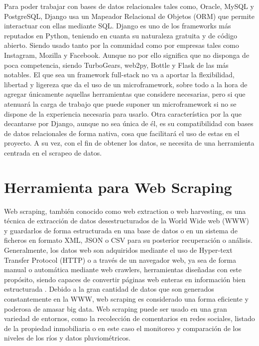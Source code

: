 Para poder trabajar con bases de datos relacionales tales como, Oracle, MySQL y PostgreSQL, Django usa un Mapeador Relacional de Objetos (ORM) que permite interactuar con ellas mediante SQL.\newline
\newline
Django es uno de los frameworks más reputados en Python, teniendo en cuanta su naturaleza gratuita y de código abierto. Siendo usado tanto por la comunidad como por empresas tales como Instagram, Mozilla y Facebook. Aunque no por ello significa que no disponga de poca competencia, siendo TurboGears, web2py, Bottle y Flask de las más notables.
\newline
\newline
El que sea un framework full-stack no va a aportar la flexibilidad, libertad y ligereza que da el uso de un microframework, sobre todo a la hora de agregar únicamente aquellas herramientas que considere necesarias, pero si que atenuará la carga de trabajo que puede suponer un microframework si no se dispone de la experiencia necesaria para usarlo.
\newline
\newline
Otra característica por la que decantarse por Django, aunque no sea única de él, es su compatibilidad con bases de datos relacionales de forma nativa, cosa que facilitará el uso de estas en el proyecto.\newline
\newline
A su vez, con el fin de obtener los datos, se necesita de una herramienta centrada en el scrapeo de datos.

\section{Herramienta para Web Scraping}
Web scraping, también conocido como web extraction o web harvesting, es una técnica de extracción de datos desestructurados de la World Wide web (WWW) y guardarlos de forma estructurada en una base de datos o en un sistema de ficheros en formato XML, JSON o CSV para su posterior recuperación o análisis. Generalmente, los datos web son adquiridos mediante el uso de Hyper-text Transfer Protocol (HTTP) o a través de un navegador web, ya sea de forma manual o automática mediante web crawlers, herramientas diseñadas con este propósito, siendo capaces de convertir páginas web enteras en información bien estructurada \cite{zhao2017web} \cite{krotov2018legality}.
\newline
\newline
Debido a la gran cantidad de datos que son generados constantemente en la WWW, web scraping es considerado una forma eficiente y poderosa de amasar big data.
\newline
\newline
Web scraping puede ser usado en una gran variedad de entornos, como la recolección de comentarios en redes sociales, listado de la propiedad inmobiliaria o en este caso el monitoreo y comparación de los niveles de los ríos y datos pluviométricos.

